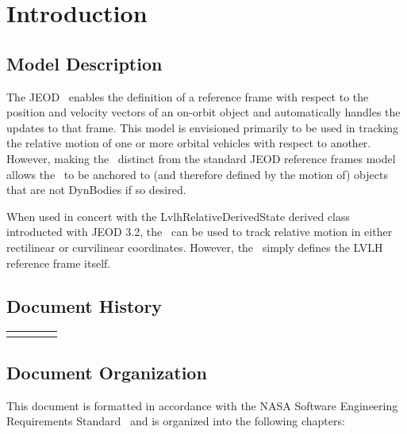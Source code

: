 \setcounter{chapter}{0}

\chapter{Introduction}\label{ch:intro}

\section{Model Description}

The JEOD \LvlhFrameDesc\ enables the definition of a reference frame with
respect to the position and velocity vectors of an on-orbit object and
automatically handles the updates to that frame. This model is envisioned
primarily to be used in tracking the relative motion of one or more
orbital vehicles with respect to another. However, making the \LvlhFrameDesc\
distinct from the standard JEOD reference frames model allows the
\LvlhFrameDesc\ to be anchored to (and therefore defined by the motion of)
objects that are not DynBodies if so desired.

When used in concert with the LvlhRelativeDerivedState derived
class introducted with JEOD 3.2, the \LvlhFrameDesc\ can be used to track
relative motion in either rectilinear or curvilinear coordinates. However,
the \LvlhFrameDesc\ simply defines the LVLH reference frame itself.


\section{Document History}

\begin{tabular}{||l|l|l|l|} \hline
\DocumentChangeHistory
\end{tabular}

\section{Document Organization}
This document is formatted in accordance with the 
NASA Software Engineering Requirements Standard~\cite{NASA:SWE} 
and is organized into the following chapters:

